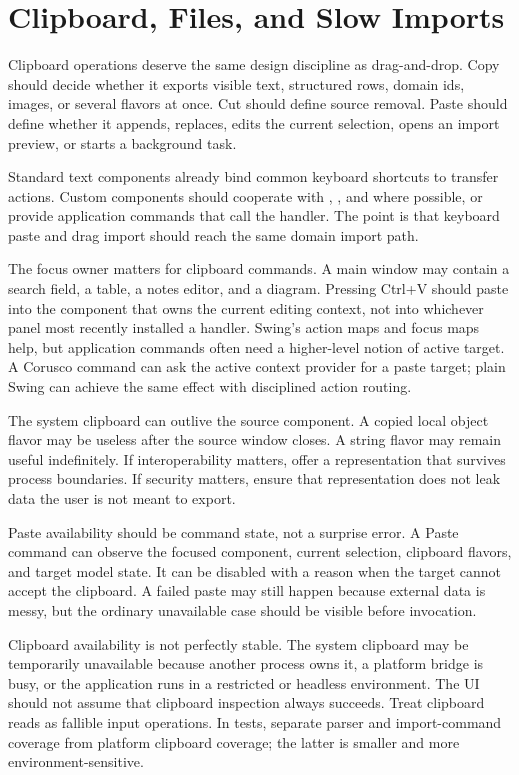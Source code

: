 \section{Clipboard, Files, and Slow Imports}

Clipboard operations deserve the same design discipline as drag-and-drop. Copy should decide whether it exports visible text, structured rows, domain ids, images, or several flavors at once. Cut should define source removal. Paste should define whether it appends, replaces, edits the current selection, opens an import preview, or starts a background task.

Standard text components already bind common keyboard shortcuts to transfer actions. Custom components should cooperate with , , and  where possible, or provide application commands that call the handler. The point is that keyboard paste and drag import should reach the same domain import path.

The focus owner matters for clipboard commands. A main window may contain a search field, a table, a notes editor, and a diagram. Pressing Ctrl+V should paste into the component that owns the current editing context, not into whichever panel most recently installed a handler. Swing's action maps and focus maps help, but application commands often need a higher-level notion of active target. A Corusco command can ask the active context provider for a paste target; plain Swing can achieve the same effect with disciplined action routing.

The system clipboard can outlive the source component. A copied local object flavor may be useless after the source window closes. A string flavor may remain useful indefinitely. If interoperability matters, offer a representation that survives process boundaries. If security matters, ensure that representation does not leak data the user is not meant to export.

Paste availability should be command state, not a surprise error. A Paste command can observe the focused component, current selection, clipboard flavors, and target model state. It can be disabled with a reason when the target cannot accept the clipboard. A failed paste may still happen because external data is messy, but the ordinary unavailable case should be visible before invocation.

Clipboard availability is not perfectly stable. The system clipboard may be temporarily unavailable because another process owns it, a platform bridge is busy, or the application runs in a restricted or headless environment. The UI should not assume that clipboard inspection always succeeds. Treat clipboard reads as fallible input operations. In tests, separate parser and import-command coverage from platform clipboard coverage; the latter is smaller and more environment-sensitive.

